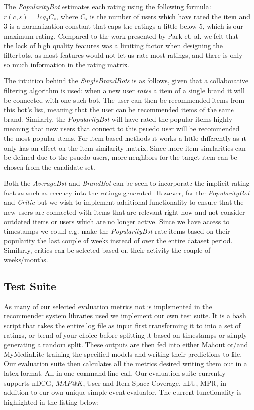The \emph{PopularityBot} estimates each rating using the following formula: $r(c,s) = log_{3}C_{s}$, where $C_{s}$ is the number of users which have rated the item and $3$ is a normalization constant that caps the ratings a little below 5, which is our maximum rating.
Compared to the work presented by Park et. al. we felt that the lack of high quality features was a limiting factor when designing the filterbots, as most features would not let us rate most ratings, and there is only so much information in the rating matrix.

The intuition behind the \emph{SingleBrandBots} is as follows, given that a collaborative filtering algorithm is used:
when a new user \emph{rates} a item of a single brand it will be connected with one such bot. The user can then be recommended
items from this bot's list, meaning that the user can be recommended items of the same brand. Similarly, the \emph{PopularityBot}
will have rated the popular items highly meaning that new users that connect to this psuedo user will be recommended the 
most popular items. For item-based methods it works a little differently as it only has an effect on the item-similarity matrix.
Since more item similarities can be defined due to the psuedo users, more neighbors for the target item can be chosen from the candidate set. 

Both the \emph{AverageBot} and \emph{BrandBot} can be seen to incorporate the implicit rating factors such as recency into
the ratings generated. However, for the \emph{PopularityBot} and \emph{Critic} but we wish to implement additional functionality to ensure
that the new users are connected with items that are relevant right now and not consider outdated items or users which
are no longer active. Since we have access to timestamps we could e.g. make the \emph{PopularityBot} rate items based on
their popularity the last couple of weeks instead of over the entire dataset period. Similarly, critics can be selected
based on their activity the couple of weeks/months.

\subsection{Test Suite}

As many of our selected evaluation metrics not is implemented in the recommender system libraries used we implement our own test suite. It is a bash
script that takes the entire log file as input first transforming it to into a set of ratings, or blend of your choice before splitting it based on timestamps
or simply generating a random split. These outputs are then fed into either Mahout or/and MyMediaLite training the specified models and writing their predictions to file. Our evaluation suite then calculates all the metrics desired writing them out in a latex format. All in one command line call. Our evaluation suite currently supports nDCG, $MAP@K$, User and Item-Space Coverage, hLU, MPR, in addition to our own unique simple event evaluator. The current functionality is
highlighted in the listing below:

